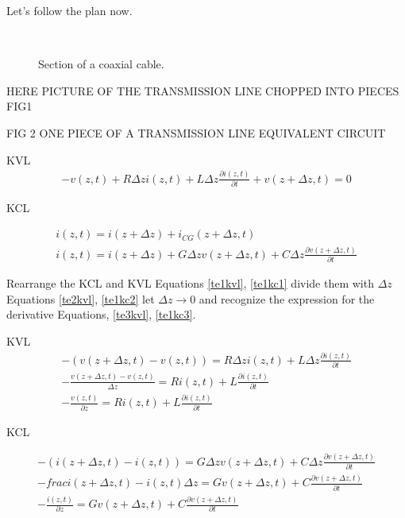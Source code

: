 Let's follow the plan now.



\begin{figure}[htbp]
\begin{center}
\strut{} \\
\end{center}
\caption{Section of a coaxial cable.}
\label{wind}
\end{figure}




HERE PICTURE OF THE TRANSMISSION LINE CHOPPED INTO PIECES FIG1

FIG 2 ONE PIECE OF A TRANSMISSION LINE EQUIVALENT CIRCUIT

KVL
\begin{eqnarray}
-v(z,t) + R \Delta z  i(z,t) + L \Delta z \frac{\partial
 i(z,t)}{\partial t} + v(z+ \Delta z,t) = 0 \nonumber
\end{eqnarray}

KCL

\begin{eqnarray}
i(z,t)=i(z+\Delta z)+ i_{CG}(z+\Delta z,t) \nonumber   \\
i(z,t)=i(z+\Delta z)+ G \Delta z v(z+\Delta z,t)+C\Delta z
\frac{\partial v(z+\Delta z,t)}{\partial t} \nonumber
\end{eqnarray}


Rearrange the KCL and KVL Equations \ref{te1kvl}, \ref{te1kc1} divide them with
$\Delta z$ Equations \ref{te2kvl}, \ref{te1kc2}
let $\Delta z \to 0$ and recognize the expression for the
derivative Equations, \ref{te3kvl}, \ref{te1kc3}.

KVL
\begin{eqnarray}
-( v(z+ \Delta z ,t)- v(z,t))=R \Delta z i(z,t)+L \Delta z
 \frac{\partial i(z,t)}{\partial t} \label{te1kvl}  \\ 
 -\frac{ v(z+ \Delta z ,t)- v(z,t)}{\Delta z}=R i(z,t)+L 
 \frac{\partial i(z,t)}{\partial t}  \label{te2kvl} \\
-\frac{v(z,t) }{\partial z}=R i(z,t)+L 
 \frac{\partial i(z,t)}{\partial t} \label{te3kvl}
\end{eqnarray}

KCL

\begin{eqnarray}
-( i(z+ \Delta z ,t)- i(z,t))= G \Delta z v(z+\Delta z,t)+C\Delta z
\frac{\partial v(z+\Delta z,t)}{\partial t} \label{te1kc1} \\
-frac{ i(z+ \Delta z ,t)- i(z,t)}{\Delta z}= G v(z+\Delta z,t)+C
\frac{\partial v(z+\Delta z,t)}{\partial t} \label{te1kc2} \\
-\frac{i(z,t) }{\partial z}= G v(z+\Delta z,t)+C
\frac{\partial v(z+\Delta z,t)}{\partial t} \label{te1kc3}
\end{eqnarray}



